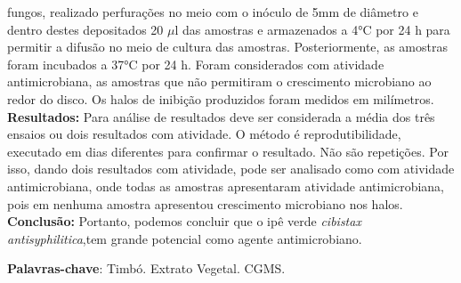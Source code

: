 \documentclass[article,12pt,onesidea,4paper,english,brazil]{abntex2}
\begin{document}
	fungos, realizado perfurações no meio com o inóculo de 5mm de diâmetro e dentro
	destes depositados 20 $\mu$l das amostras e armazenados a 4°C por 24 h para permitir
	a difusão no meio de cultura das amostras. Posteriormente, as amostras foram
	incubados a 37°C por 24 h. Foram considerados com atividade antimicrobiana, as
	amostras que não permitiram o crescimento microbiano ao redor do disco. Os halos
	de inibição produzidos foram medidos em milímetros. \textbf{Resultados:} Para análise de
	resultados deve ser considerada a média dos três ensaios ou dois resultados com
	atividade. O método é reprodutibilidade, executado em dias diferentes para
	confirmar o resultado. Não são repetições. Por isso, dando dois resultados com
	atividade, pode ser analisado como com atividade antimicrobiana, onde todas as
	amostras apresentaram atividade antimicrobiana, pois em nenhuma amostra
	apresentou crescimento microbiano nos halos. \textbf{Conclusão:} Portanto, podemos
	concluir que o ipê verde \textit{cibistax antisyphilitica},tem grande potencial como agente
	antimicrobiano.
	
	\vspace{\onelineskip}
	
	\noindent
	\textbf{Palavras-chave}: Timbó. Extrato Vegetal. CGMS.	
	
\end{document}
